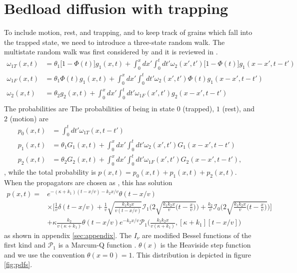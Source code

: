 \documentclass[]{agujournal2018}
\newcommand\om{\omega}
\begin{document}
\section{Bedload diffusion with trapping}
To include motion, rest, and trapping, and to keep track of grains which fall into the trapped state, we need to introduce a three-state random walk.
The multistate random walk was first considered by \citet{Weiss1976} and it is reviewed in \citet{Weiss1994}.
\begin{align}
\om_{1T}(x,t) &= \theta_1\big[1-\Phi(t)\big]g_1(x,t) + \int_0^x dx' \int_0^t dt' \om_2(x',t')\big[1-\Phi(t)\big]g_1(x-x',t-t')\\
\om_{1F}(x,t) &= \theta_1\Phi(t)g_1(x,t) + \int_0^x dx' \int_0^t dt' \om_2(x',t') \Phi(t) g_1(x-x',t-t')\\
\om_2(x,t) &= \theta_2 g_2(x,t) + \int_0^x dx' \int_0^t dt' \om_{1F}(x',t')g_2(x-x',t-t')\\
\end{align}
The probabilities are 
The probabilities of being in state $0$ (trapped), $1$ (rest), and $2$ (motion) are
\begin{align}
p_0(x,t) &= \int_0^t dt' \omega_{1T}(x,t-t')\\
p_1(x,t) &= \theta_1 G_1(x,t) + \int_0^x dx' \int_0^t dt' \omega_2(x',t')G_1(x-x',t-t')\\
p_2(x,t) &= \theta_2 G_2(x,t) + \int_0^x dx' \int_0^t dt' \omega_{1F}(x',t')G_2(x-x',t-t'),
\end{align},
while the total probability is $p(x,t) = p_0(x,t) + p_1(x,t) + p_2(x,t)$.
When the propagators are chosen as \citet{Lisle1998}, this has solution 
\begin{align}
p(x,t) = &e^{-(\kappa + k_1)(t-x/v)-k_2x/v} \theta(t-x/v)\\
&\times \Bigg[\frac{1}{v}\delta(t-x/v) + \frac{1}{v}\sqrt{\frac{k_1k_2x}{v(t-x/v)}}\mathcal{I}_1\Bigg(2\sqrt{\frac{k_1k_2x}{v}\Big(t-\frac{x}{v}\Big)}\Bigg) +\frac{k_2}{v}\mathcal{I}_0\Bigg(2\sqrt{\frac{k_1k_2x}{v}\Big(t-\frac{x}{v}\Big)}\Bigg) \Bigg]\\
&+ \kappa\frac{ k_2}{v(\kappa+k_1)}\theta(t-x/v)e^{-k_2x/v}\mathcal{P}_1\Big(\frac{k_1k_2x}{v(\kappa+k_1)},[\kappa+k_1][t-x/v] \Big)
\label{eq:pdf}
\end{align}
as shown in appendix \ref{sec:appendix}. The $I_\nu$ are modified Bessel functions of the first kind and $\mathcal{P}_1$ is a Marcum-Q function \citep{Marcum1960,Temme1996}. $\theta(x)$ is the Heaviside step function and we use the convention $\theta(x=0)=1$.
This distribution is depicted in figure \ref{fig:pdfs}.
\end{document}
